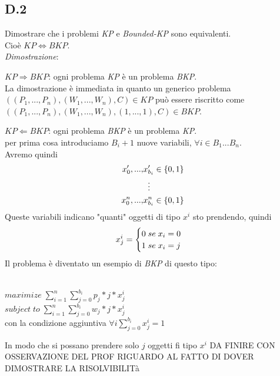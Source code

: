 \documentclass[a4paper]{article}
\newenvironment{dimostrazione}{\textit{Dimostrazione}:\begin{adjustwidth}{1cm}{}}{\end{adjustwidth}}
\begin{document}
\subsection{D.2}
Dimostrare che i problemi \emph{KP} e \emph{Bounded-KP} sono equivalenti.\\Cioè $KP \Leftrightarrow BKP$.\\
\begin{dimostrazione}
	$KP \Rightarrow BKP$: ogni problema \emph{KP} è un problema \emph{BKP}.\\
	La dimostrazione è immediata in quanto un generico problema\\$((P_1, ... ,P_n),(W_1, ... ,W_n),C)\in KP$ può essere riscritto come\\ $((P_1, ... ,P_n),(W_1, ... ,W_n),(1, ... ,1),C) \in BKP$.

	$KP \Leftarrow BKP$: ogni problema \emph{BKP} è un problema \emph{KP}.\\
	per prima cosa introduciamo $B_i + 1$ nuove variabili, $\forall i \in B_1 ... B_n$.\\
	Avremo quindi
	\begin{align}
		x_{0}', ... ,&x_{b_i}' \in \{0,1\}  \notag \\
   		&\;\;\vdots \notag \\
		x_{0}^n, ... ,&x_{b_i}^n \in \{0,1\}  \notag 
	\end{align}
	Queste variabili indicano "quanti" oggetti di tipo $x^i$ sto prendendo, quindi 
	\begin{equation}
		x_{j}^i=\begin{cases}
      		0\; se\; x_i = 0\\
      		1\; se\; x_i = j \notag
    		\end{cases}
	\end{equation}
	Il problema è diventato un esempio di \emph{BKP} di questo tipo:
	\begin{center}
		\\
		$maximize \; \sum_{i=1}^{n} \sum_{j=0}^{b_i} p_j*j*x^i_j$\\
		$subject \; to \; \sum_{i=1}^{n} \sum_{j=0}^{b_i} w_j*j*x^i_j$\\
		con la condizione aggiuntiva $ \forall i \sum_{j=0}^{b_i} x_j^i = 1$
	\end{center}
	In modo che  si possano prendere solo $j$ oggetti fi tipo $x^i$
	DA FINIRE CON OSSERVAZIONE DEL PROF RIGUARDO AL FATTO DI DOVER DIMOSTRARE LA RISOLVIBILITà
\end{dimostrazione}
\end{document}
